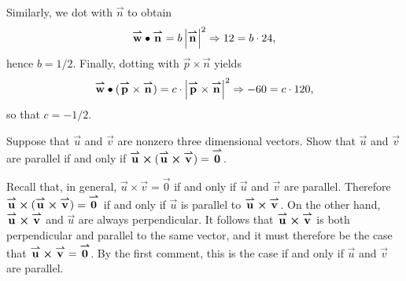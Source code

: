 \documentclass[noauthor, handout]{ximera}
\begin{document}
\begin{problem}
\begin{freeResponse}
Similarly, we dot with $\vec{n}$ to obtain
$$
\vec{w} \dotp \vec{n} = b \left|\vec{n}\right|^2 \Rightarrow 12 = b \cdot 24,
$$
hence $b = 1/2$. Finally, dotting with $\vec{p} \times \vec{n}$ yields
$$
\vec{w} \dotp (\vec{p} \times \vec{n}) = c \cdot \left|\vec{p} \times \vec{n} \right|^2 \Rightarrow -60 = c \cdot 120,
$$
so that $c = -1/2$. 
\end{freeResponse}
\end{problem}

\begin{problem}
Suppose that $\vec{u}$ and $\vec{v}$ are nonzero three dimensional vectors.  Show that $\vec{u}$ and $\vec{v}$ are parallel if and only if $\vec{u} \cross (\vec{u} \cross \vec{v}) = \vec{0}$. 

\begin{freeResponse}
Recall that, in general, $\vec{u} \times \vec{v} = \vec{0}$ if and only if $\vec{u}$ and $\vec{v}$ are parallel. Therefore $\vec{u} \cross (\vec{u} \cross \vec{v}) = \vec{0}$ if and only if $\vec{u}$ is parallel to $\vec{u} \cross \vec{v}$. On the other hand, $\vec{u} \cross \vec{v}$ and $\vec{u}$ are always perpendicular. It follows that $\vec{u} \cross \vec{v}$ is both perpendicular and parallel to the same vector, and it must therefore be the case that $\vec{u} \cross \vec{v} = \vec{0}$. By the first comment, this is the case if and only if $\vec{u}$ and $\vec{v}$ are parallel. 
\end{freeResponse}
\end{problem}
\end{document}
